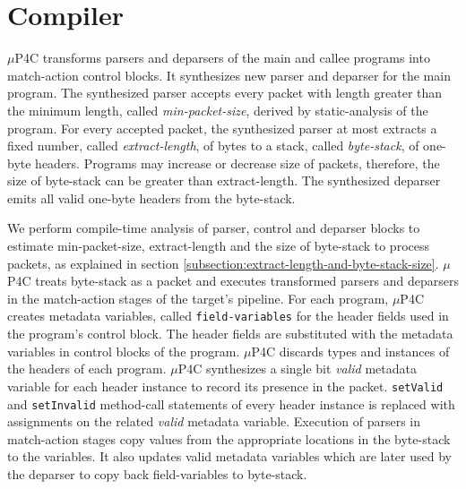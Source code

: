 \section{Compiler}
$\mu$P4C transforms parsers and deparsers of the main and callee programs into match-action control blocks.
It synthesizes new parser and deparser for the main program.
The synthesized parser accepts every packet with length greater than the minimum length, called \emph{min-packet-size}, derived by static-analysis of the program.
For every accepted packet, the synthesized parser at most extracts a fixed number, called \emph{extract-length}, of bytes to a stack, called \emph{byte-stack}, of one-byte headers.
Programs may increase or decrease size of packets, therefore, the size of byte-stack can be greater than extract-length.
The synthesized deparser emits all valid one-byte headers from the byte-stack.




We perform compile-time analysis of parser, control and deparser blocks to estimate min-packet-size, extract-length and the size of byte-stack to process packets, as explained in section \ref{subsection:extract-length-and-byte-stack-size}. 
$\mu$P4C treats byte-stack as a packet and executes transformed parsers and deparsers in the match-action stages of the target's pipeline.
For each program, $\mu$P4C creates metadata variables, called \texttt{field-variables} for the header fields used in the program's control block.
The header fields are substituted with the metadata variables in control blocks of the program.
$\mu$P4C discards types and instances of the headers of each program.
$\mu$P4C synthesizes a single bit \emph{valid} metadata variable for each header instance to record its presence in the packet.
\texttt{setValid} and \texttt{setInvalid} method-call statements of every header instance is replaced with assignments on the related \emph{valid} metadata variable.
Execution of parsers in match-action stages copy values from the appropriate locations in the byte-stack to the variables.
It also updates valid metadata variables which are later used by the deparser to copy back field-variables to byte-stack.




